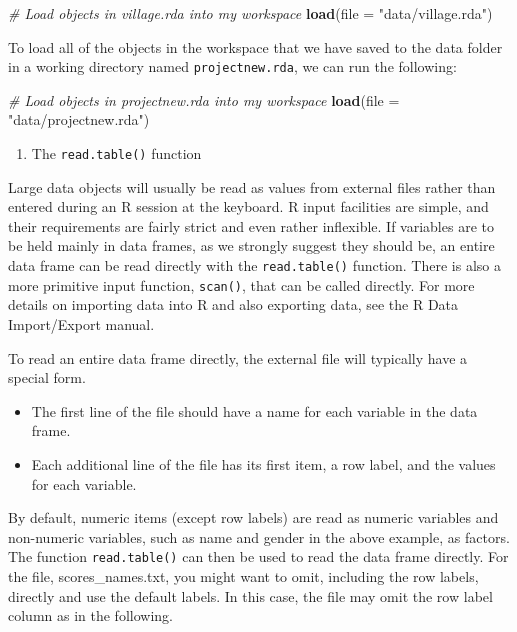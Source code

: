 \documentclass[]{book}
\newenvironment{Shaded}{\begin{snugshade}}{\end{snugshade}}
\newcommand{\KeywordTok}[1]{\textcolor[rgb]{0.13,0.29,0.53}{\textbf{#1}}}
\newcommand{\DataTypeTok}[1]{\textcolor[rgb]{0.13,0.29,0.53}{#1}}
\newcommand{\StringTok}[1]{\textcolor[rgb]{0.31,0.60,0.02}{#1}}
\newcommand{\CommentTok}[1]{\textcolor[rgb]{0.56,0.35,0.01}{\textit{#1}}}
\newcommand{\NormalTok}[1]{#1}
\providecommand{\tightlist}{%
  \setlength{\itemsep}{0pt}\setlength{\parskip}{0pt}}
\begin{document}
\begin{Shaded}
\begin{Highlighting}[]
\CommentTok{# Load objects in village.rda into my workspace}
\KeywordTok{load}\NormalTok{(}\DataTypeTok{file =} \StringTok{"data/village.rda"}\NormalTok{)}
\end{Highlighting}
\end{Shaded}

To load all of the objects in the workspace that we have saved to the
data folder in a working directory named \texttt{projectnew.rda}, we can
run the following:

\begin{Shaded}
\begin{Highlighting}[]
\CommentTok{# Load objects in projectnew.rda into my workspace}
\KeywordTok{load}\NormalTok{(}\DataTypeTok{file =} \StringTok{"data/projectnew.rda"}\NormalTok{)}
\end{Highlighting}
\end{Shaded}

\begin{enumerate}
\def\labelenumi{\arabic{enumi}.}
\setcounter{enumi}{1}
\tightlist
\item
  The \texttt{read.table()} function
\end{enumerate}

Large data objects will usually be read as values from external files
rather than entered during an R session at the keyboard. R input
facilities are simple, and their requirements are fairly strict and even
rather inflexible. If variables are to be held mainly in data frames, as
we strongly suggest they should be, an entire data frame can be read
directly with the \texttt{read.table()} function. There is also a more
primitive input function, \texttt{scan()}, that can be called directly.
For more details on importing data into R and also exporting data, see
the R Data Import/Export manual.

To read an entire data frame directly, the external file will typically
have a special form.

\begin{itemize}
\tightlist
\item
  The first line of the file should have a name for each variable in the
  data frame.
\item
  Each additional line of the file has its first item, a row label, and
  the values for each variable.
\end{itemize}

By default, numeric items (except row labels) are read as numeric
variables and non-numeric variables, such as name and gender in the
above example, as factors. The function \texttt{read.table()} can then
be used to read the data frame directly. For the file,
scores\_names.txt, you might want to omit, including the row labels,
directly and use the default labels. In this case, the file may omit the
row label column as in the following.
\end{document}
